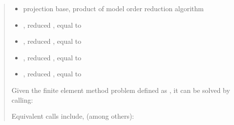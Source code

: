 \documentclass[letterpaper,10pt,english]{sphinxmanual}
\begin{document}
\begin{quote}
\begin{description}
\begin{description}
\begin{itemize}
\item {} 
\sphinxAtStartPar
{} \sphinxhyphen{}  projection base, product of model order reduction algorithm

\item {} 
\sphinxAtStartPar
{} \sphinxhyphen{} , reduced , equal to 

\item {} 
\sphinxAtStartPar
{} \sphinxhyphen{} , reduced , equal to 

\item {} 
\sphinxAtStartPar
{} \sphinxhyphen{} , reduced , equal to 

\item {} 
\sphinxAtStartPar
{} \sphinxhyphen{} , reduced , equal to 

\end{itemize}

\end{description}

\sphinxAtStartPar
Given the finite element method problem defined as , it can be solved by calling:

\begin{sphinxVerbatim}[commandchars=\\\{\}]
              
\end{sphinxVerbatim}

\sphinxAtStartPar
Equivalent calls include, (among others):


\end{description}
\end{quote}
\end{document}
